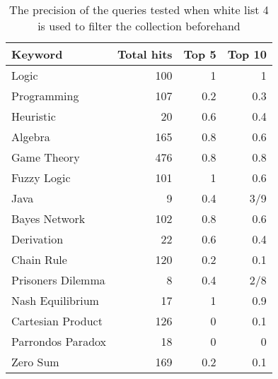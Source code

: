 \begin{table}[H]
\centering
\begin{tabular} {|| p{15em} | r | r | r ||} 
 \hline
 Keyword & Total hits & Top 5 & Top 10 \\ [0.5ex] 
 \hline

Logic & 100 & 1 & 1 \\
Programming & 107 & 0.2 & 0.3 \\
Heuristic & 20 & 0.6 & 0.4 \\
Algebra & 165 & 0.8 & 0.6 \\
Game Theory & 476 & 0.8 & 0.8 \\
\hline
Fuzzy Logic & 101 & 1 & 0.6 \\
Java & 9 & 0.4 & 3/9 \\
Bayes Network & 102 & 0.8 & 0.6 \\
Derivation & 22 & 0.6 & 0.4 \\
\hline
Chain Rule & 120 & 0.2 & 0.1 \\
Prisoners Dilemma & 8 & 0.4 & 2/8 \\
Nash Equilibrium & 17 & 1 & 0.9 \\
Cartesian Product & 126 & 0 & 0.1 \\
Parrondos Paradox & 18 & 0 & 0 \\
Zero Sum & 169 & 0.2 & 0.1 \\

 \hline
\end{tabular}
\caption{The precision of the queries tested when white list 4 is used to filter the collection beforehand}
\label{table:p_test_list4}
\end{table}



\cleardoublepage